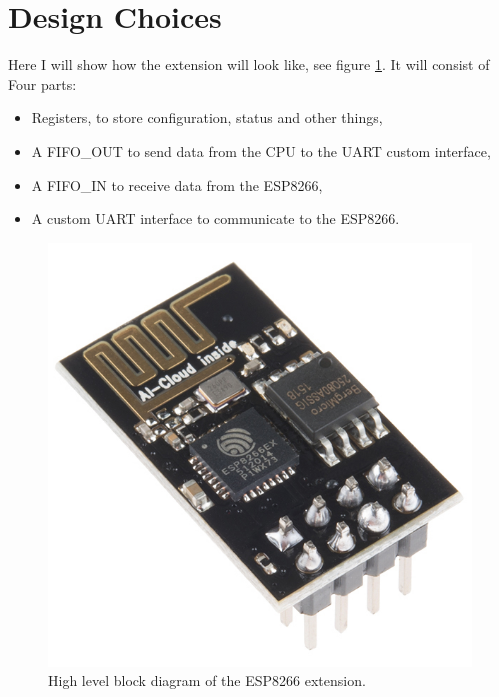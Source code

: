 \documentclass[11pt]{article}
\begin{document}
\section{Design Choices}
Here I will show how the extension will look like, see figure \ref{high_level}. It will consist of Four parts:
\begin{itemize}
    \item Registers, to store configuration, status and other things,
    \item A FIFO\_OUT to send data from the CPU to the UART custom interface,
    \item A FIFO\_IN to receive data from the ESP8266,
    \item A custom UART interface to communicate to the ESP8266.
\end{itemize}
\begin{figure}[H]
    \includegraphics[width=.7\linewidth]{ESP8266.jpg}
    \caption{High level block diagram of the ESP8266 extension.}
    \label{high_level}
\end{figure}
\end{document}
